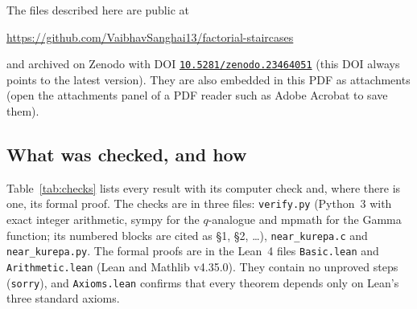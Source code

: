 \documentclass[11pt]{amsart}
\theoremstyle{plain}
\theoremstyle{definition}
\theoremstyle{remark}
\begin{document}
The files described here are public at
\begin{center}
\url{https://github.com/VaibhavSanghai13/factorial-staircases}
\end{center}
and archived on Zenodo with DOI
\href{https://doi.org/10.5281/zenodo.23464051}{\texttt{10.5281/zenodo.23464051}}
(this DOI always points to the latest version). They are also embedded in this PDF as attachments (open the attachments panel of a PDF
reader such as Adobe Acrobat to save them).

\subsection{What was checked, and how}
Table~\ref{tab:checks} lists every result with its computer check and, where
there is one, its formal proof. The checks are in three files:
\texttt{verify.py} (Python~3 with exact integer arithmetic, sympy for the
$q$-analogue and mpmath for the Gamma function; its numbered blocks are cited
as \S1, \S2, \dots), \texttt{near\_kurepa.c} and \texttt{near\_kurepa.py}. The
formal proofs are in the Lean~4 files \texttt{Basic.lean} and
\texttt{Arithmetic.lean} (Lean and Mathlib v4.35.0). They contain no unproved
steps (\texttt{sorry}), and \texttt{Axioms.lean} confirms that every theorem
depends only on Lean's three standard axioms.
\end{document}
